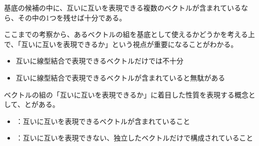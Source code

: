 \documentclass[../../../topic_linear-algebra]{subfiles}
\begin{document}
基底の候補の中に、互いに互いを表現できる複数のベクトルが含まれているなら、その中の1つを残せば十分である。

\sectionline

ここまでの考察から、あるベクトルの組を基底として使えるかどうかを考える上で、「互いに互いを表現できるか」という視点が重要になることがわかる。

\begin{itemize}
  \item 互いに線型結合で表現できるベクトルだけでは不十分
  \item 互いに線型結合で表現できるベクトルが含まれていると無駄がある
\end{itemize}

ベクトルの組の「互いに互いを表現できるか」に着目した性質を表現する概念として、とがある。

\begin{itemize}
  \item {}：互いに互いを表現できるベクトルが含まれていること
  \item {}：互いに互いを表現できない、独立したベクトルだけで構成されていること
\end{itemize}
\end{document}
